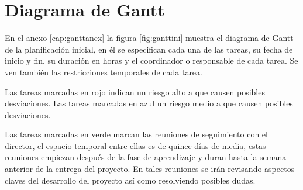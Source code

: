 \section{Diagrama de Gantt}
En el anexo \ref{cap:ganttanex} la figura \ref{fig:ganttini} muestra el diagrama de Gantt de la planificación inicial, en él se especifican cada una de las tareas, su fecha de inicio y fin, su duración en horas y el coordinador o responsable de cada tarea. Se ven también las restricciones temporales de cada tarea.

Las tareas marcadas en rojo indican un riesgo alto a que causen posibles desviaciones.
Las tareas marcadas en azul un riesgo medio a que causen posibles desviaciones.

Las tareas marcadas en verde marcan las reuniones de seguimiento con el director, el espacio temporal entre ellas es de quince días de media, estas reuniones empiezan después de la fase de aprendizaje y duran hasta la semana anterior de la entrega del proyecto. En tales reuniones se irán revisando aspectos claves del desarrollo del proyecto así como resolviendo posibles dudas.







